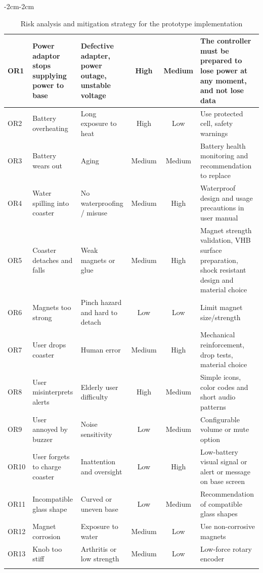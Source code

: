 \documentclass{article}
\begin{document}
\begin{adjustwidth}{-2cm}{-2cm}
\begin{longtable}{|p{1cm}|p{3.2cm}|p{4cm}|c|c|p{4cm}|}
OR1 & Power adaptor stops supplying power to base & Defective adapter, power outage, unstable voltage & High & Medium & The controller must be prepared to lose power at any moment, and not lose data \\ \hline
OR2 & Battery overheating & Long exposure to heat & High & Low & Use protected cell, safety warnings \\ \hline
OR3 & Battery wears out & Aging & Medium & Medium & Battery health monitoring and recommendation to replace \\ \hline
OR4 & Water spilling into coaster & No waterproofing / misuse & Medium & High & Waterproof design and usage precautions in user manual \\ \hline
OR5 & Coaster detaches and falls & Weak magnets or glue & Medium & High & Magnet strength validation, VHB surface preparation, shock resistant design and material choice \\ \hline
OR6 & Magnets too strong & Pinch hazard and hard to detach & Low & Low & Limit magnet size/strength \\ \hline
OR7 & User drops coaster & Human error & Medium & High & Mechanical reinforcement, drop tests, material choice \\ \hline
OR8 & User misinterprets alerts & Elderly user difficulty & High & Medium & Simple icons, color codes and short audio patterns \\ \hline
OR9 & User annoyed by buzzer & Noise sensitivity & Low & Medium & Configurable volume or mute option \\ \hline
OR10 & User forgets to charge coaster & Inattention and oversight & Low & High & Low-battery visual signal or alert or message on base screen \\ \hline
OR11 & Incompatible glass shape & Curved or uneven base & Low & Medium & Recommendation of compatible glass shapes \\ \hline
OR12 & Magnet corrosion & Exposure to water & Medium & Low & Use non-corrosive magnets \\ \hline
OR13 & Knob too stiff & Arthritis or low strength & Medium & Low & Low-force rotary encoder \\ \hline

\captionsetup{justification=centering}
\caption{Risk analysis and mitigation strategy for the prototype implementation}
\label{tab:risk_analysis}

\end{longtable}
\end{adjustwidth}
\end{document}
